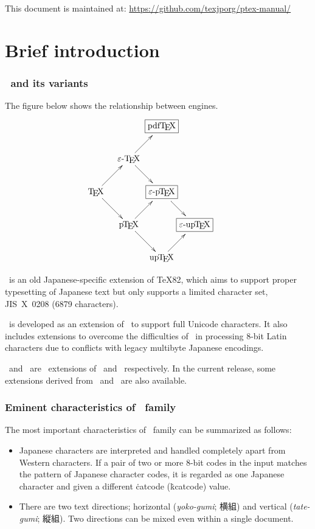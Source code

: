 \documentclass[a4paper,11pt,dvipdfmx]{article}
\def\Foreign#1{\textit{#1}}
\begin{document}
This document is maintained at:
\url{https://github.com/texjporg/ptex-manual/}

\tableofcontents


\newpage


\part{Brief introduction}%

\section{\pTeX\ and its variants}

The figure below shows the relationship between engines.
\[
\xymatrix@ur{
 \text{\TeX}   \ar[r]\ar[d] & \text{\eTeX}  \ar[r]\ar[d]
   & \text{\fbox{\pdfTeX}} \\
 \text{\pTeX}  \ar[r]\ar[d] & \text{\fbox{\epTeX}} \ar[d] &\\
 \text{\upTeX} \ar[r]       & \text{\fbox{\eupTeX}}       &
}
\]

\pTeX\ is an old Japanese-specific extension of \TeX82,
which aims to support proper typesetting of Japanese text
but only supports a limited character set, JIS~X~0208 (6879 characters).

\upTeX\ is developed as an extension of \pTeX\ to support full Unicode
characters. It also includes extensions to overcome the difficulties of
\pTeX\ in processing 8-bit Latin characters due to conflicts with
legacy multibyte Japanese encodings.

\epTeX\ and \eupTeX\ are \eTeX\ extensions of \pTeX\ and \upTeX\ respectively.
In the current release, some extensions derived from \pdfTeX\ and \OMEGA\ are
also available.

\section{Eminent characteristics of \pTeX\ family}

The most important characteristics of \pTeX\ family can be
summarized as follows:
\begin{itemize}
  \item Japanese characters are interpreted and handled completely apart from
    Western characters. If a pair of two or more 8-bit codes in the input
    matches the pattern of Japanese character codes, it is regarded as one
    Japanese character and given a different \.{catcode} (\.{kcatcode}) value.
  \item There are two text directions; horizontal (\Foreign{yoko-gumi}; 横組)
    and vertical (\Foreign{tate-gumi}; 縦組).
    Two directions can be mixed even within a single document.
\end{itemize}
\end{document}
